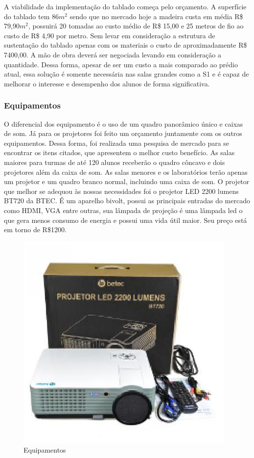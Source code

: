 A viabilidade da implementação do tablado começa pelo orçamento. A superfície do tablado tem 86$m^2$ sendo que no mercado hoje a madeira custa em média R\$ 79,90$m^2$, possuirá 20 tomadas ao custo médio de R\$ 15,00 e 25 metros de fio ao custo de R\$ 4,90 por metro. Sem levar em consideração a estrutura de sustentação do tablado apenas com os materiais o custo de aproximadamente R\$ 7400,00. A mão de obra deverá ser negociada levando em consideração a quantidade. Dessa forma, apesar de ser um custo a mais comparado ao prédio atual, essa solução é somente necessária nas salas grandes como a S1 e é capaz de melhorar o interesse e desempenho dos alunos de forma significativa.

\subsubsection{Equipamentos}
O diferencial dos equipamento é o uso de um quadro panorâmico único e caixas de som. Já para os projetores foi feito um orçamento juntamente com os outros equipamentos. Dessa forma, foi realizada uma pesquisa de mercado para se encontrar os itens citados, que apresentem o melhor custo benefício. As salas maiores para turmas de até 120 alunos receberão o quadro côncavo e dois projetores além da caixa de som. As salas menores e os laboratórios terão apenas um projetor e um quadro branco normal, incluindo uma caixa de som.
O projetor que melhor se adequou às nossas necessidades foi o projetor LED 2200 lumens BT720 da BTEC. É um aparelho bivolt, possui as principais entradas do mercado como HDMI, VGA entre outras, sua lâmpada de projeção é uma lâmpada led o que gera menos consumo de energia e possui uma vida útil maior. Seu preço está em torno de R\$1200.

\begin{figure}[!h]
\centering
\includegraphics[keepaspectratio=true,scale=1]{figuras/equipamentos.eps}
\caption{Equipamentos}
\end{figure}

